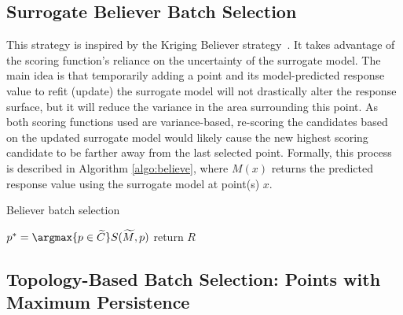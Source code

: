 \subsection{Surrogate Believer Batch Selection}
This strategy is inspired by the Kriging Believer strategy~\cite{GotovosCasatiHitz2013,GinsbourgerLeRicheCarraro2009}.
%
It takes advantage of the scoring function's reliance on the uncertainty of the surrogate model.
%
The main idea is that temporarily adding a point and its model-predicted response value to refit (update) the surrogate model will not drastically alter the response surface, but it will reduce the variance in the area surrounding this point.
%
As both scoring functions used are variance-based, re-scoring the candidates based on the updated surrogate model would likely cause the new highest scoring candidate to be farther away from the last selected point.
%
Formally, this process is described in Algorithm \ref{algo:believe}, where $M(x)$ returns the predicted response value using the surrogate model at point(s) $x$.

{\fontsize{10}{10}\selectfont
\begin{algorithm}
\scriptsize
\caption{Believer batch selection}
\label{algo:believe}
\begin{algorithmic}
  \State $p^* = \argmax{p \in \widetilde{C}} S(\widetilde{M}, p)$
\EndWhile
\State return $R$
\EndProcedure
\end{algorithmic}
\end{algorithm}
}

\subsection{Topology-Based Batch Selection: Points with Maximum Persistence}
\label{subsection:topology-maxp}

